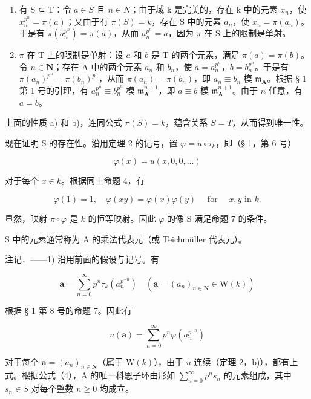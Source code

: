 \begin{enumerate}
\def\labelenumi{\alph{enumi})}
\item
  有 S ⊂ T：令 \(a \in S\) 且 \(n \in N\)；由于域 k 是完美的，存在 k 中的元素 \(x_{n}\)，使 \(x_{n}^{p^{n}} = \pi(a)\)；又由于有 \(\pi(S) = k\)，存在 S 中的元素 \(a_{n}\)，使 \(x_{n} = \pi(a_{n})\)。于是有 \(\pi(a_{n}^{p^{n}}) = \pi(a)\)，从而 \(a_{n}^{p^{n}} = a\)，因为 \(\pi\) 在 S 上的限制是单射。
\item
  \(\pi\) 在 T 上的限制是单射：设 \(a\) 和 \(b\) 是 T 的两个元素，满足 \(\pi(a) = \pi(b)\)。令 \(n \in \mathbf{N}\)；存在 A 中的两个元素 \(a_n\) 和 \(b_n\)，使 \(a = a_n^{p^n}\)，\(b = b_n^{p^n}\)。于是有 \(\pi(a_n)^{p^n} = \pi(b_n)^{p^n}\)，从而 \(\pi(a_n) = \pi(b_n)\)，即 \(a_n \equiv b_n\) 模 \(\mathfrak{m}_{\mathbf{A}}\)。根据 § 1 第 1 号的引理，有 \(a_n^{p^n} \equiv b_n^{p^n}\) 模 \(\mathfrak{m}_{\mathbf{A}}^{n+1}\)，即 \(a \equiv b\) 模 \(\mathfrak{m}_{\mathbf{A}}^{n+1}\)。由于 \(n\) 任意，有 \(a = b\)。
\end{enumerate}

上面的性质 a) 和 b)，连同公式 \(\pi(S) = k\)，蕴含关系 \(S = T\)，从而得到唯一性。

现在证明 S 的存在性。沿用定理 2 的记号，置 \(\varphi = u \circ \tau_k\)，即（§ 1，第 6 号）

\[
\varphi (x) = u (x, 0, 0, \dots)\tag{2}
\]

对于每个 \(x \in k\)。根据同上命题 4，有

\[
\varphi (1) = 1, \quad \varphi (x y) = \varphi (x) \varphi (y) \quad \text { for } \quad x, y \text {   in   } k.\tag{3}
\]

显然，映射 \(\pi \circ \varphi\) 是 \(k\) 的恒等映射。因此 \(\varphi\) 的像 S 满足命题 7 的条件。

S 中的元素通常称为 A 的乘法代表元（或 Teichmüller 代表元）。

注记．——1) 沿用前面的假设与记号。有

\[
\boldsymbol {a} = \sum_ {n = 0} ^ {\infty} p ^ {n} \tau_ {k} (a _ {n} ^ {p ^ {- n}}) \quad (\boldsymbol {a} = (a _ {n}) _ {n \in \mathbf {N}} \in \mathrm{W} (k))
\]

根据 § 1 第 8 号的命题 7。因此有

\[
u (\boldsymbol {a}) = \sum_ {n = 0} ^ {\infty} p ^ {n} \varphi (a _ {n} ^ {p ^ {- n}})\tag{4}
\]

对于每个 \(\boldsymbol{a} = (a_n)_{n \in \mathbf{N}}\)（属于 \(\mathrm{W}(k)\)），由于 \(u\) 连续（定理 2，b)），都有上式。根据公式（4），A 的唯一科恩子环由形如 \(\sum_{n=0}^{\infty} p^n s_n\) 的元素组成，其中 \(s_n \in S\) 对每个整数 \(n \geqslant 0\) 均成立。

